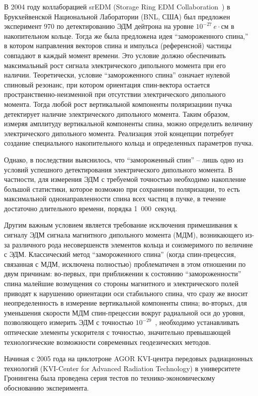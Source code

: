 В 2004 году коллаборацией srEDM (Storage Ring EDM Collaboration~\cite{BNL:SREDM}) 
в Брукхейвенской Национальной Лаборатории (BNL, США) был предложен эксперимент 970 
по детектированию ЭДМ дейтрона на уровне $10^{-27}~e\cdot$см в накопительном кольце. 
Тогда же была предложена идея ``замороженного спина,''~\cite{Farley:SREDM:Muon} 
в котором направления векторов спина и импульса (референсной) частицы совпадают в каждый момент времени. Это условие должно обеспечивать максимальный рост сигнала электрического дипольного момента при его наличии. Теоретически, условие ``замороженного спина'' означает нулевой спиновый резонанс, при котором ориентация спин-вектора остается  пространственно-неизменной при отсутствии электрического дипольного момента. 
Тогда любой рост вертикальной компоненты поляризациии пучка детектирует наличие электрического дипольного момента. Таким образом, измеряя  амплитуду вертикальной компоненты спина, можно определить величину электрического дипольного момента. Реализация этой концепции потребует создание специального накопительного кольца и определенных параметров пучка.

Однако, в последствии выяснилось, что ``замороженный спин'' -- лишь одно из условий успешного детектирования электрического дипольного момента. В частности, для измерения ЭДМ с требуемой точностью необходимо накопление большой статистики, которое возможно при сохранении поляризации, то есть максимальной однонаправленности спина всех частиц в пучке, в течение достаточно длительного времени, порядка 1~000~секунд. 

Другим важным условием является требование исключения примешивания к сигналу ЭДМ 
сигнала магнитного дипольного момента (МДМ), возникающего из-за различного рода несовершенств 
элементов кольца и соизмеримого по величине с ЭДМ. 
Классический метод ``замороженного спина'' (когда спин-прецессия, связанная с МДМ, исключена полностью) проблематичен в этом отношении по двум причинам: 
во-первых, при приближении к состоянию ``замороженности'' спина малейшие возмущения со стороны магнитного и электрического полей приводят к нарушению ориентации оси стабильного спина, что сразу же вносит неопределенность в измерение вертикальной компоненты спина; 
во-вторых, для уменьшения скорости МДМ спин-прецессии вокруг радиальной оси до уровня, позволяющего измерить ЭДМ с точностью $10^{-29}$~\ecm, необходимо устанавливать оптические элементы ускорителя с точностью, значительно превышающей технологические возможности современных геодезических методов.

Начиная с 2005 года на циклотроне AGOR KVI-центра передовых радиационных технологий 
(KVI-Center for Advanced Radiation Technology) в университете Гронингена была проведена серия тестов 
по технико-экономическому обоснованию эксперимента.

